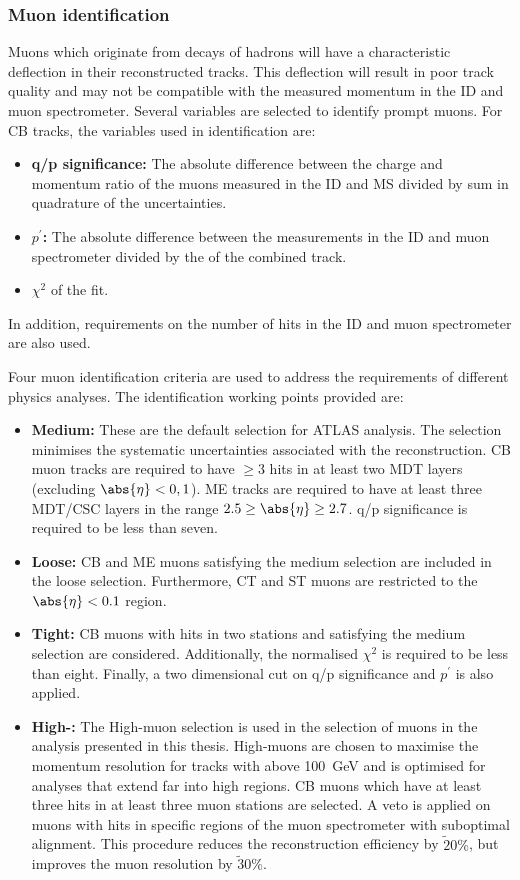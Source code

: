 \subsubsection{Muon identification}
Muons which originate from decays of hadrons will have a characteristic deflection in their reconstructed tracks. This deflection will result in poor track quality and may not be compatible with the measured momentum in the ID and muon spectrometer. Several variables are selected to identify prompt muons. For CB tracks, the variables used in identification are:
\begin{itemize}
    \item \textbf{q/p significance:} The absolute difference between the charge and momentum ratio of the muons measured in the ID and MS divided by sum in quadrature of the uncertainties. 
    \item \textbf{$p^\prime$:} The absolute difference between the \pt measurements in the ID and muon spectrometer divided by the \pt of the combined track.
    \item $\chi^2$ of the fit.
\end{itemize}
In addition, requirements on the number of hits in the ID and muon spectrometer are also used. 

Four muon identification criteria are used to address the requirements of different physics analyses. The identification working points provided are: 
\begin{itemize}
    \item \textbf{Medium:} These are the default selection for ATLAS analysis. The selection minimises the systematic uncertainties associated with the reconstruction. CB muon tracks are required to have $\geq 3$ hits in at least two MDT layers (excluding $\abs{\eta} < 0,1$). ME tracks are required to have at least three MDT/CSC layers in the range $2.5 \geq \abs{\eta} \geq 2.7$. q/p significance is required to be less than seven.
    \item \textbf{Loose:} CB and ME muons satisfying the medium selection are included in the loose selection. Furthermore, CT and ST muons are restricted to the $\abs{\eta} < 0.1$ region.
    \item \textbf{Tight:} CB muons with hits in two stations and satisfying the medium selection are considered. Additionally, the normalised $\chi^2$ is required to be less than eight. Finally, a two dimensional cut on q/p significance and \emph{$p^\prime$} is also applied. 
    \item \textbf{High-\pt:} The High-\pt muon selection is used in the selection of muons in the analysis presented in this thesis. High-\pt muons are chosen to maximise the momentum resolution for tracks with \pt above \SI{100}{\giga\electronvolt} and is optimised for analyses that extend far into high \pt regions. CB muons which have at least three hits in at least three muon stations are selected. A veto is applied on muons with hits in specific regions of the muon spectrometer with suboptimal alignment. This procedure reduces the reconstruction efficiency by $\tilde20\%$, but improves the muon \pt resolution by $\tilde30\%$.
\end{itemize}

